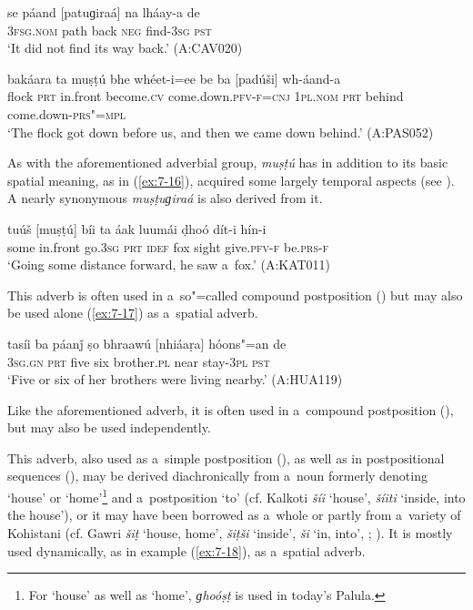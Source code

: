 \begin{exe}
\ex
\label{ex:7-14}
\gll se páand [patuɡiraá] na lháay-a de  \\
\textsc{3fsg.nom} path back  \textsc{neg} find-\textsc{3sg} \textsc{pst}\\
\glt `It did not find its way back.' (A:CAV020)

\ex
\label{ex:7-15}
\gll bakáara ta muṣṭú bhe whéet-i=ee  be ba [padúši] wh-áand-a \\
flock \textsc{prt} in.front become.\textsc{cv} come.down.\textsc{pfv-f=cnj} \textsc{1pl.nom} \textsc{prt} behind come.down-\textsc{prs"=mpl}\\
\glt `The flock got down before us, and then we came down behind.' (A:PAS052)
\end{exe}

 As with the aforementioned adverbial group, \textit{muṣṭú} has in addition to its basic spatial meaning, as in (\ref{ex:7-16}), acquired some largely temporal aspects (see ). A nearly synonymous \textit{muṣṭuɡiraá} is also derived from it. 

\begin{exe}
\ex
\label{ex:7-16}
\gll tuúš [muṣṭú] bíi ta áak luumái ḍhoó dít-i hín-i \\
some in.front go.\textsc{3sg} \textsc{prt} \textsc{idef} fox sight give.\textsc{pfv-f} be.\textsc{prs-f}\\
\glt `Going some distance forward, he saw a~fox.' (A:KAT011)
\end{exe}

 This adverb is often used in a~so"=called compound postposition () but may also be used alone (\ref{ex:7-17}) as a~spatial adverb.
\begin{exe}
\ex
\label{ex:7-17}
\gll tasíi ba páanǰ ṣo bhraawú [nhiáaṛa] hóons"=an de \\
\textsc{3sg.gn} \textsc{prt} five six brother.\textsc{pl} near stay-\textsc{3pl} \textsc{pst}\\
\glt `Five or six of her brothers were living nearby.' (A:HUA119)
\end{exe}

 Like the aforementioned adverb, it is often used in a~compound postposition (), but may also be used independently.

 This adverb, also used as a~simple postposition
(), as well as in postpositional sequences (), may be derived diachronically from
a~noun formerly denoting `house' or `home'\footnote{For `house' as well as `home',
  \textit{ɡhoóṣṭ} is used in today's Palula.} and a~postposition `to' (cf. Kalkoti
\textit{šíi} `house', \textit{šíiti} `inside, into the house'), or it may have been borrowed
as a~whole or partly from a~variety of Kohistani (cf. Gawri \textit{šiṭ} `house, home',
\textit{šiṭši} `inside', \textit{ši} `in, into', \citealt[119]{baart1997}; \citeyear[76]{baart1999a}). It is mostly used
dynamically, as in example (\ref{ex:7-18}), as a~spatial adverb.

